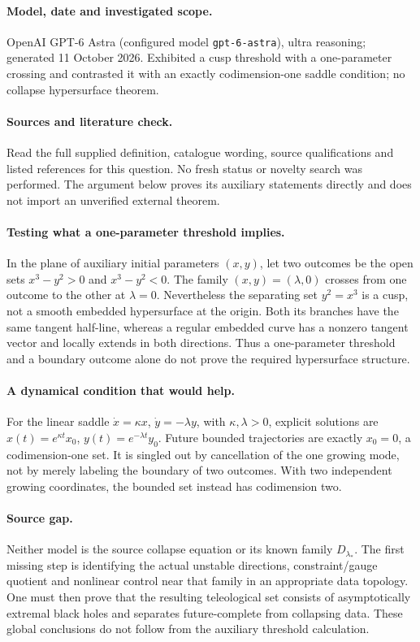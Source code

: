 \documentclass[11pt]{article}
\begin{document}
\paragraph{Model, date and investigated scope.}
OpenAI GPT-6 Astra (configured model \texttt{gpt-6-astra}), ultra reasoning; generated 11 October 2026. Exhibited a cusp threshold with a one-parameter crossing and contrasted it with an exactly codimension-one saddle condition; no collapse hypersurface theorem.

\paragraph{Sources and literature check.}
Read the full supplied definition, catalogue wording, source qualifications and listed references for this question. No fresh status or novelty search was performed. The argument below proves its auxiliary statements directly and does not import an unverified external theorem.

\paragraph{Testing what a one-parameter threshold implies.} In the plane of auxiliary initial parameters \((x,y)\), let two outcomes be the open sets \(x^3-y^2>0\) and \(x^3-y^2<0\). The family \((x,y)=(\lambda,0)\) crosses from one outcome to the other at \(\lambda=0\). Nevertheless the separating set \(y^2=x^3\) is a cusp, not a smooth embedded hypersurface at the origin. Both its branches have the same tangent half-line, whereas a regular embedded curve has a nonzero tangent vector and locally extends in both directions. Thus a one-parameter threshold and a boundary outcome alone do not prove the required hypersurface structure.
\paragraph{A dynamical condition that would help.} For the linear saddle \(\dot x=\kappa x\), \(\dot y=-\lambda y\), with \(\kappa,\lambda>0\), explicit solutions are \(x(t)=e^{\kappa t}x_0\), \(y(t)=e^{-\lambda t}y_0\). Future bounded trajectories are exactly \(x_0=0\), a codimension-one set. It is singled out by cancellation of the one growing mode, not by merely labeling the boundary of two outcomes. With two independent growing coordinates, the bounded set instead has codimension two.
\paragraph{Source gap.} Neither model is the source collapse equation or its known family \(D_{\lambda_*}\). The first missing step is identifying the actual unstable directions, constraint/gauge quotient and nonlinear control near that family in an appropriate data topology. One must then prove that the resulting teleological set consists of asymptotically extremal black holes and separates future-complete from collapsing data. These global conclusions do not follow from the auxiliary threshold calculation.
\end{document}
